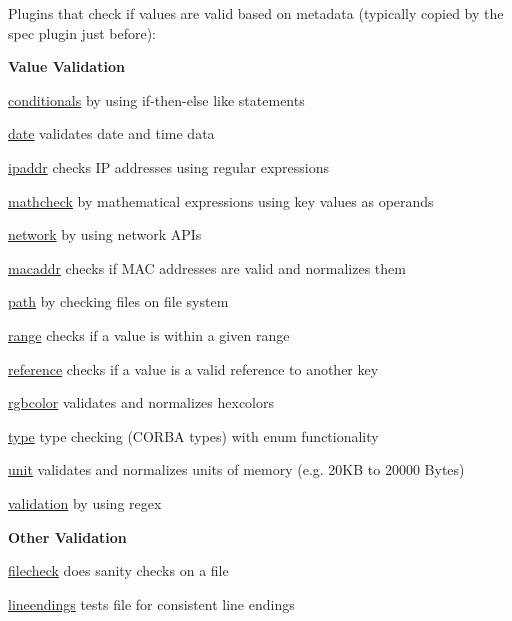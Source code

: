 Plugins that check if values are valid based on metadata (typically copied by the {\ttfamily spec} plugin just before)\+:

{\bfseries Value Validation}


\begin{DoxyItemize}
\item \hyperlink{autotoc_md86_src_plugins_conditionals_README_md}{conditionals} by using if-\/then-\/else like statements
\item \hyperlink{autotoc_md149_src_plugins_date_README_md}{date} validates date and time data
\item \hyperlink{autotoc_md320_src_plugins_ipaddr_README_md}{ipaddr} checks IP addresses using regular expressions
\item \hyperlink{autotoc_md401_src_plugins_mathcheck_README_md}{mathcheck} by mathematical expressions using key values as operands
\item \hyperlink{autotoc_md486_src_plugins_network_README_md}{network} by using network A\+P\+Is
\item \hyperlink{autotoc_md397_src_plugins_macaddr_README_md}{macaddr} checks if M\+AC addresses are valid and normalizes them
\item \hyperlink{autotoc_md522_src_plugins_path_README_md}{path} by checking files on file system
\item \hyperlink{autotoc_md572_src_plugins_range_README_md}{range} checks if a value is within a given range
\item \hyperlink{autotoc_md597_src_plugins_reference_README_md}{reference} checks if a value is a valid reference to another key
\item \hyperlink{autotoc_md629_src_plugins_rgbcolor_README_md}{rgbcolor} validates and normalizes hexcolors
\item \hyperlink{autotoc_md803_src_plugins_type_README_md}{type} type checking (C\+O\+R\+BA types) with enum functionality
\item \hyperlink{autotoc_md814_src_plugins_unit_README_md}{unit} validates and normalizes units of memory (e.\+g. 20\+KB to 20000 Bytes)
\item \hyperlink{autotoc_md818_src_plugins_validation_README_md}{validation} by using regex
\end{DoxyItemize}

{\bfseries Other Validation}


\begin{DoxyItemize}
\item \hyperlink{autotoc_md228_src_plugins_filecheck_README_md}{filecheck} does sanity checks on a file
\item \hyperlink{autotoc_md384_src_plugins_lineendings_README_md}{lineendings} tests file for consistent line endings
\end{DoxyItemize}


